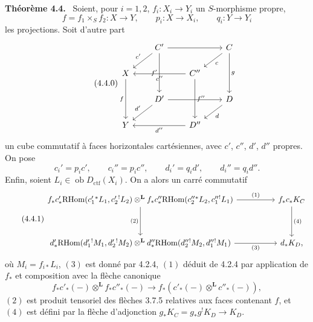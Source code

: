 \documentclass[11pt]{article}
\newenvironment{statement}[1]{\par\medskip\noindent\textbf{#1.}\ }{\par\medskip}
\newcommand{\ob}{\operatorname{ob}}
\providecommand{\RHom}{\mathrm{RHom}}
\providecommand{\Dctf}{D_{\mathrm{ctf}}}
\providecommand{\Dctf}{D_{\mathrm{ctf}}}
\providecommand{\RHom}{\mathrm{RHom}}
\providecommand{\ob}{\operatorname{ob}}
\providecommand{\RHom}{\mathrm R\mathcal{H}om}
\begin{document}
\begin{statement}{Théorème 4.4}
Soient, pour $i=1,2$, $f_i:X_i\longrightarrow Y_i$ un $S$-morphisme propre,
\[
f=f_1\times_S f_2:X\longrightarrow Y,\qquad
p_i:X\longrightarrow X_i,\qquad q_i:Y\longrightarrow Y_i
\]
les projections. Soit d'autre part
\begin{equation}
\tag{4.4.0}
\begin{tikzcd}[column sep=2.1em,row sep=1.6em]
& C' \arrow[rr] \arrow[dl,"c'"'] \arrow[dd,"f'"'] && C \arrow[dl,"c"] \arrow[dd,"g"] \\
X \arrow[dd,"f"'] && C'' \arrow[ll,"c''"] \arrow[dd,"f''"] \\
& D' \arrow[rr] \arrow[dl,"d'"'] && D \arrow[dl,"d"] \\
Y && D'' \arrow[ll,"d''"]
\end{tikzcd}
\end{equation}
un cube commutatif à faces horizontales cartésiennes, avec $c'$, $c''$, $d'$, $d''$ propres. On pose
\[
c_i'=p_i c',\qquad c_i''=p_i c'',\qquad d_i'=q_i d',\qquad d_i''=q_i d''.
\]
Enfin, soient $L_i\in\ob \Dctf(X_i)$. On a alors un carré commutatif
\begin{equation}
\tag{4.4.1}
\begin{tikzcd}[column sep=huge,row sep=huge]
f_*c'_*\RHom(c_1'{}^*L_1,c_2'{}^!L_2)\otimes^{\mathbf L}
f_*c''_*\RHom(c_2''{}^*L_2,c_1''{}^!L_1)
 \arrow[r,"(1)"] \arrow[d,"(2)"'] &
f_*c_*K_C \arrow[d,"(4)"] \\
d'_*\RHom(d_1'{}^!M_1,d_2'{}^!M_2)\otimes^{\mathbf L}
d''_*\RHom(d_2''{}^!M_2,d_1''{}^!M_1)
 \arrow[r,"(3)"'] &
d_*K_D ,
\end{tikzcd}
\end{equation}
où $M_i=f_{i*}L_i$, $(3)$ est donné par 4.2.4, $(1)$ déduit de 4.2.4 par application de $f_*$ et composition avec la flèche canonique
\[
f_*c'_*(-)\otimes^{\mathbf L} f_*c''_*(-)\longrightarrow f_*(c'_*(-)\otimes^{\mathbf L}c''_*(-)),
\]
$(2)$ est produit tensoriel des flèches 3.7.5 relatives aux faces contenant $f$, et $(4)$ est défini par la flèche d'adjonction $g_*K_C=g_*g^!K_D\longrightarrow K_D$.
\end{statement}
\end{document}
